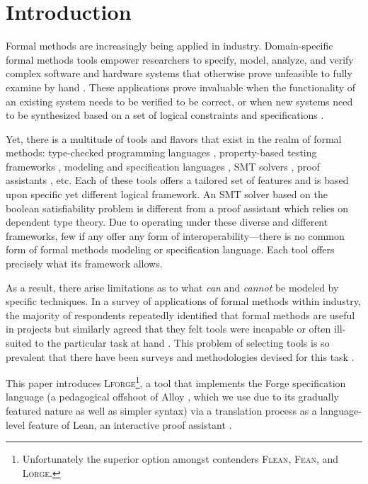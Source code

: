 
\section{Introduction}
Formal methods are increasingly being applied in industry. Domain-specific formal methods tools empower researchers to specify, model, analyze, and verify complex software and hardware systems that otherwise prove unfeasible to fully examine by hand \cite{abrial2006formal,lecomte2017applying}. These applications prove invaluable when the functionality of an existing system needs to be verified to be correct, or when new systems need to be synthesized based on a set of logical constraints and specifications \cite{woodcock2009formal}.

Yet, there is a multitude of tools and flavors that exist in the realm of formal methods: type-checked programming languages \cite{gao2017type,chaudhuri2017fast}, property-based testing frameworks \cite{fink1997property,maciver2019hypothesis}, modeling and specification languages \cite{jackson2012software,jackson2019alloy,ngpdbccdlrrvwwk-oopsla-2024}, SMT solvers \cite{de2008z3}, proof assistants \cite{moura2021lean}, etc. Each of these tools offers a tailored set of features and is based upon specific yet different logical framework. An SMT solver based on the boolean satisfiability problem is different from a proof assistant which relies on dependent type theory. Due to operating under these diverse and different frameworks, few if any offer any form of interoperability---there is no common form of formal methods modeling or specification language. Each tool offers precisely what its framework allows. 

As a result, there arise limitations as to what \emph{can} and \emph{cannot} be modeled by specific techniques. In a survey of applications of formal methods within industry, the majority of respondents repeatedly identified that formal methods are useful in projects but similarly agreed that they felt tools were incapable or often ill-suited to the particular task at hand \cite{woodcock2009formal}. This problem of selecting tools is so prevalent that there have been surveys and methodologies devised for this task \cite{kossak2016select,cheng2006survey}. 

This paper introduces \textsc{Lforge}\footnote{Unfortunately the superior option amongst contenders \textsc{Flean}, \textsc{Fean}, and \textsc{Lorge}.}, a tool that implements the Forge specification language \cite{ngpdbccdlrrvwwk-oopsla-2024} (a pedagogical offshoot of Alloy \cite{jackson2012software}, which we use due to its gradually featured nature as well as simpler syntax) via a translation process as a language-level feature of Lean, an interactive proof assistant \cite{moura2021lean}.

